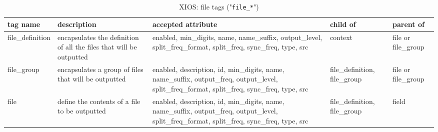 \documentclass[../main/NEMO_manual]{subfiles}
\begin{document}
\begin{table}
  \begin{tabularx}{\textwidth}{|l|X|X|X|l|}
    \hline
    tag name                                                            &
    description                                                         &
    accepted attribute                                                  &
    child of                                                            &
    parent of           \\
    \hline
    \hline
    file\_definition                                                    &
    encapsulates the definition of all the files that will be outputted &
    enabled, min\_digits, name, name\_suffix, output\_level,
    split\_freq\_format, split\_freq, sync\_freq, type, src             &
    context                                                             &
    file or file\_group \\
    \hline
    file\_group                                                         &
    encapsulates a group of files that will be outputted                &
    enabled, description, id, min\_digits, name, name\_suffix, output\_freq, output\_level,
    split\_freq\_format, split\_freq, sync\_freq, type, src             &
    file\_definition, file\_group                                       &
    file or file\_group \\
    \hline
    file                                                                &
    define the contents of a file to be outputted                       &
    enabled, description, id, min\_digits, name, name\_suffix, output\_freq, output\_level,
    split\_freq\_format, split\_freq, sync\_freq, type, src             &
    file\_definition, file\_group                                       &
    field               \\
    \hline
  \end{tabularx}
  \caption{XIOS: file tags ("\texttt{file\_*}")}
\end{table}
\end{document}
